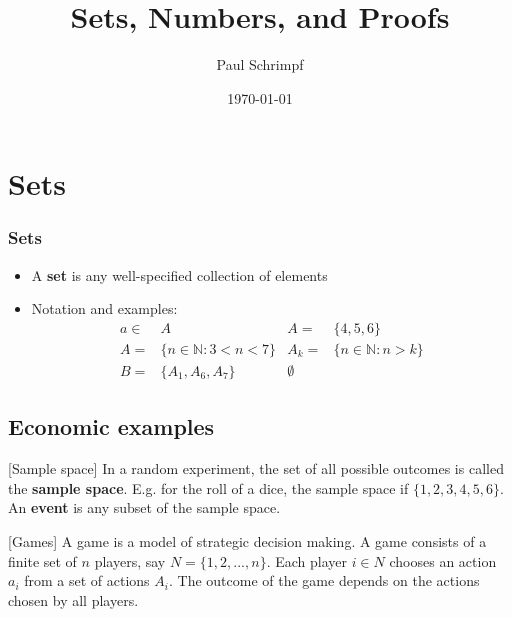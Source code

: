 \documentclass[compress]{beamer}
\title{Sets, Numbers, and Proofs}
\author{Paul Schrimpf}
\institute{UBC \\ Economics 526}
\date{\today}
\begin{document}
\frame{\titlepage}

\begin{frame}
  \tableofcontents  
\end{frame}


\section{Sets \label{s:sets}} 

\begin{frame}
  \frametitle{Sets}
  \begin{itemize}
  \item A \textbf{set} is any well-specified collection of
    elements
  \item Notation and examples:
    \begin{align*} 
      a \in & A   & 
      A = & \{4 , 5, 6 \} \\
      A = & \{n \in \mathbb{N}: 3 < n < 7 \}  & 
      A_k = & \{ n \in \mathbb{N}: n > k \} \\ 
      B = & \{ A_1, A_6, A_7 \} & \emptyset 
    \end{align*}
  \end{itemize}
\end{frame}
\subsection{Economic examples}

\begin{frame}
  \begin{example}\label{ex:sampleSpace}[Sample space]
    In a random experiment, the set of all possible outcomes is called
    the \textbf{sample space}. E.g. for the roll of a dice, the sample
    space if $\{1,2 ,3 , 4, 5, 6\}$. An \textbf{event} is any subset of
    the sample space.
  \end{example}
\end{frame}

\begin{frame}
  \begin{example}\label{ex:games}[Games]
    A game is a model of strategic decision making. A game consists of a
    finite set of $n$ players, say $N = \{1,2,..., n\}$. Each player $i
    \in N$ chooses an action $a_i$ from a set of actions $A_i$. The
    outcome of the game depends on the actions chosen by all players. 
  \end{example}
\end{frame}
\end{document}
